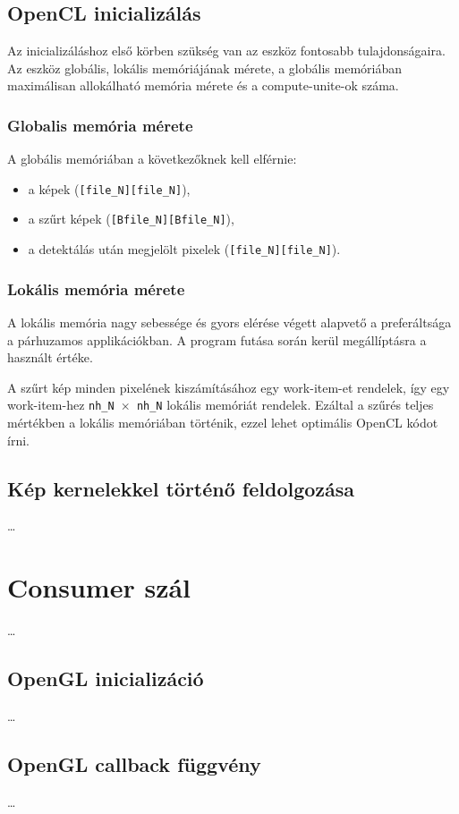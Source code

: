 	\subsection*{OpenCL inicializálás}
	Az inicializáláshoz első körben szükség van az eszköz fontosabb tulajdonságaira. Az eszköz globális, lokális memóriájának mérete,
	a globális memóriában maximálisan allokálható memória mérete és a compute-unite-ok száma.
	\subsubsection{Globalis memória mérete}
	A globális memóriában a következőknek kell elférnie:
	\begin{itemize}
	  \item a képek (\texttt{[file\_N][file\_N]}),
	  \item a szűrt képek (\texttt{[Bfile\_N][Bfile\_N]}),
	  \item a detektálás után megjelölt pixelek (\texttt{[file\_N][file\_N]}).
	\end{itemize}
	
	\subsubsection{Lokális memória mérete}
	A lokális memória nagy sebessége és gyors elérése végett alapvető a preferáltsága a párhuzamos applikációkban.
	A program futása során kerül megállíptásra a használt értéke.
	
	A szűrt kép minden pixelének kiszámításához egy work-item-et rendelek, így egy work-item-hez \texttt{nh\_N $\times$ nh\_N}
	lokális memóriát rendelek. Ezáltal a szűrés teljes mértékben a lokális memóriában történik, ezzel lehet optimális OpenCL kódot írni.
	
	\subsection*{Kép kernelekkel történő feldolgozása}
	\ldots


\section{Consumer szál}
	\dots
	\subsection*{OpenGL inicializáció}
	\ldots
	
	\subsection*{OpenGL callback függvény}
	\dots